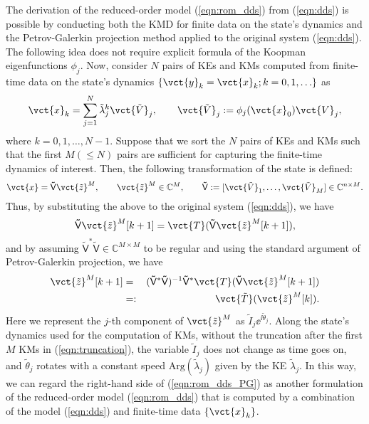 \documentclass[a4paper,10pt]{article}
\def\bbC{{\mathbb{C}}}
\begin{document}
%
The derivation of the reduced-order model (\ref{eqn:rom_dds}) from (\ref{eqn:dds}) is possible by conducting both the KMD for finite data on the state's dynamics and the Petrov-Galerkin projection method \cite{Holmes:1996} applied to the original system (\ref{eqn:dds}).  
The following idea does not require explicit formula of the Koopman eigenfunctions $\phi_j$.  
Now, consider $N$ pairs of KEs and KMs computed from finite-time data on the state's dynamics $\{\vct{y}_k=\vct{x}_k; k=0,1,\ldots\}$ as
\begin{equation}
\vct{x}_k=\sum_{j=1}^{N}\tilde{\lambda}^k_j\vct{\tilde{V}}_j,\makebox[2em]{}
\vct{\tilde{V}}_j:=\phi_j(\vct{x}_0)\vct{V}_j,
\label{eqn:truncation}
\end{equation}
where $k=0,1,\ldots,N-1$.  
Suppose that we sort the $N$ pairs of KEs and KMs such that the first $M(\leq N)$ pairs are sufficient for capturing the finite-time dynamics of interest.  
Then, the following transformation of the state is defined:
\[
\vct{x}=\mathsf{\tilde{V}}\vct{\tilde{z}}^M,\makebox[2em]{}
\vct{\tilde{z}}^M\in\bbC^M,\makebox[2em]{}
\mathsf{\tilde{V}}:=[\vct{\tilde{V}}_1,\ldots,\vct{\tilde{V}}_M]\in\bbC^{n\times M}.
\]
Thus, by substituting the above to the original system (\ref{eqn:dds}), we have
\[
\mathsf{\tilde{V}}\vct{\tilde{z}}^M[k+1]=\vct{T}(\mathsf{\tilde{V}}\vct{\tilde{z}}^M[k+1]),
\]
and by assuming $\mathsf{\tilde{V}}^\ast\mathsf{\tilde{V}}\in\bbC^{M\times M}$ to be regular and using the standard argument of Petrov-Galerkin projection, we have
\begin{eqnarray}
\vct{\tilde{z}}^M[k+1] &=& (\mathsf{\tilde{V}}^\ast\mathsf{\tilde{V}})^{-1}\mathsf{\tilde{V}}^\ast\vct{T}(\mathsf{\tilde{V}}\vct{\tilde{z}}^M[k+1])
\nonumber\\
&=:& \vct{\tilde{T}}(\vct{\tilde{z}}^M[k]).
\label{eqn:rom_dds_PG}
\end{eqnarray}
Here we represent the $j$-th component of $\vct{\tilde{z}}^M$ as $\tilde{I}_j\ee^{\ii\tilde{\theta}_j}$.  
Along the state's dynamics used for the computation of KMs, without the truncation after the first $M$ KMs in (\ref{eqn:truncation}), the variable $\tilde{I}_j$ does not change as time goes on, and $\tilde{\theta}_j$ rotates with a constant speed $\mathrm{Arg}(\tilde{\lambda}_j)$ given by the KE $\tilde{\lambda}_j$.  
In this way, we can regard the right-hand side of (\ref{eqn:rom_dds_PG}) as another formulation of the reduced-order model (\ref{eqn:rom_dds}) that is computed by a combination of the model (\ref{eqn:dds}) and finite-time data $\{\vct{x}_k\}$.  
\end{document}
